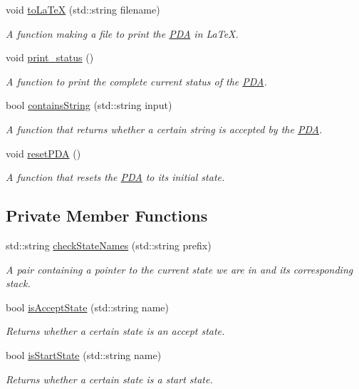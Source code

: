 \begin{DoxyCompactItemize}
void \hyperlink{classPDA_1_1PDA_a741e99b5d9e53e32d6808bf83dde96b2}{to\-La\-Te\-X} (std\-::string filename)
\begin{DoxyCompactList}\small\item\em A function making a file to print the \hyperlink{classPDA_1_1PDA}{P\-D\-A} in La\-Te\-X. \end{DoxyCompactList}\item 
void \hyperlink{classPDA_1_1PDA_a04c7164ddd8488e074741259cb9a8db4}{print\-\_\-status} ()
\begin{DoxyCompactList}\small\item\em A function to print the complete current status of the \hyperlink{classPDA_1_1PDA}{P\-D\-A}. \end{DoxyCompactList}\item 
bool \hyperlink{classPDA_1_1PDA_a7f6cb548bcd3860306e3c96e0041ffd4}{contains\-String} (std\-::string input)
\begin{DoxyCompactList}\small\item\em A function that returns whether a certain string is accepted by the \hyperlink{classPDA_1_1PDA}{P\-D\-A}. \end{DoxyCompactList}\item 
void \hyperlink{classPDA_1_1PDA_ae4c877df604fd88c6725145cea4e86bd}{reset\-P\-D\-A} ()
\begin{DoxyCompactList}\small\item\em A function that resets the \hyperlink{classPDA_1_1PDA}{P\-D\-A} to its initial state. \end{DoxyCompactList}\end{DoxyCompactItemize}
\subsection*{Private Member Functions}
\begin{DoxyCompactItemize}
\item 
std\-::string \hyperlink{classPDA_1_1PDA_af707f305d9b16dbc3dcb686a3f63fca4}{check\-State\-Names} (std\-::string prefix)
\begin{DoxyCompactList}\small\item\em A pair containing a pointer to the current state we are in and its corresponding stack. \end{DoxyCompactList}\item 
bool \hyperlink{classPDA_1_1PDA_aa245040d766419cc4e9ddcd825ab6ca5}{is\-Accept\-State} (std\-::string name)
\begin{DoxyCompactList}\small\item\em Returns whether a certain state is an accept state. \end{DoxyCompactList}\item 
bool \hyperlink{classPDA_1_1PDA_a37329b27d0ac02e944d1160a4462fbce}{is\-Start\-State} (std\-::string name)
\begin{DoxyCompactList}\small\item\em Returns whether a certain state is a start state. \end{DoxyCompactList}\end{DoxyCompactItemize}
